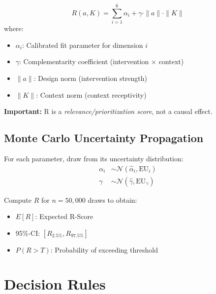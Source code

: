 \begin{tcolorbox}[colback=blue!5!white, colframe=blue!75!black,
    title=Axiom RSC-1: R-Score Formula]
\begin{equation}
R(a,K) = \sum_{i=1}^{6} \alpha_i + \gamma \cdot \|a\| \cdot \|K\|
\end{equation}
where:
\begin{itemize}[nosep]
\item $\alpha_i$: Calibrated fit parameter for dimension $i$
\item $\gamma$: Complementarity coefficient (intervention $\times$ context)
\item $\|a\|$: Design norm (intervention strength)
\item $\|K\|$: Context norm (context receptivity)
\end{itemize}
\end{tcolorbox}

\textbf{Important:} R is a \emph{relevance/prioritization score}, not a causal effect.

\subsection{Monte Carlo Uncertainty Propagation}

For each parameter, draw from its uncertainty distribution:
\begin{align}
\alpha_i &\sim \mathcal{N}(\hat{\alpha}_i, \text{EU}_i) \\
\gamma &\sim \mathcal{N}(\hat{\gamma}, \text{EU}_\gamma)
\end{align}

Compute $R$ for $n = 50{,}000$ draws to obtain:
\begin{itemize}[nosep]
\item $E[R]$: Expected R-Score
\item 95\%-CI: $[R_{2.5\%}, R_{97.5\%}]$
\item $P(R > T)$: Probability of exceeding threshold
\end{itemize}


\section{Decision Rules}
\label{sec:iii-decision}

